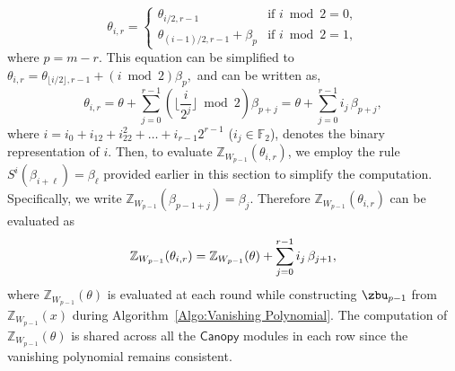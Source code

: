 \begin{equation*}
	\theta_{i, r} =
	\begin{cases}
		\theta_{i / 2, r - 1} & \text{if } i \bmod 2 = 0,\\
		\theta_{(i - 1) / 2, r - 1} + \beta_{p} & \text{if } i \bmod 2 = 1,
	\end{cases}
\end{equation*}
where $p=m-r$. This equation can be simplified to 
$
\theta_{i, r} = \theta_{\lfloor i / 2 \rfloor, r - 1} + (i \bmod{2}) \beta_{p},
$
and can be written as,
\begin{equation*}
	\theta_{i, r} = \theta + \sum_{j=0}^{r - 1} \left( \lfloor \frac{i}{2^j} \rfloor \bmod{2} \right) \beta_{p+j} = \theta + \sum_{j=0}^{r - 1} i_j \, \beta_{p+j},
\end{equation*}
where $i = i_0 + i_12 + i_22^2 + \ldots + i_{r-1}2^{r-1}$ ($i_j \in \mathbb{F}_2$), denotes the binary representation of $i$. Then, to evaluate $\mathbb{Z}_{W_{p-1}}(\theta_{i, r})$, we employ the rule $S^{i}(\beta_{i+\ell}) = \beta_{\ell}$ provided earlier in this section to simplify the computation. Specifically, we write $\mathbb{Z}_{W_{p-1}}(\beta_{p-1 + j}) = \beta_j$. Therefore $\mathbb{Z}_{W_{p-1}}(\theta_{i, r})$ can be evaluated as
\begin{equation*}
	\setlength{\jot}{3pt}  %
	\mathbb{Z}_{W_{p-1}}(\theta_{i, r}) =  \mathbb{Z}_{W_{p-1}}(\theta) + \sum_{j=0}^{r - 1} i_j \, \beta_{j+1},
\end{equation*}
where \(\mathbb{Z}_{W_{p-1}}(\theta)\) is evaluated at each round while constructing \(\zbu_{p-1}\) from \(\mathbb{Z}_{W_{p-1}}(x)\) during Algorithm~\ref{Algo:Vanishing Polynomial}. The computation of \(\mathbb{Z}_{W_{p-1}}(\theta)\) is shared across all the \(\mathsf{Canopy}\) modules in each row since the vanishing polynomial remains consistent. 

